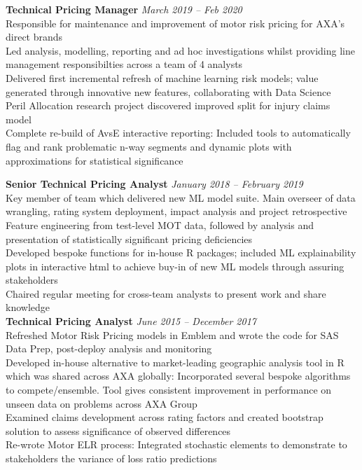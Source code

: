 \documentclass[11pt]{article}
\begin{document}
\begin{description}
\textbf{Technical Pricing Manager} \emph{March 2019 -- Feb 2020}\\
\textbullet \quad Responsible for maintenance and improvement of motor risk pricing for AXA's direct brands\\
\textbullet \quad Led analysis, modelling, reporting and ad hoc investigations whilst providing line management responsibilties across a team of 4 analysts\\
\textbullet \quad Delivered first incremental refresh of machine learning risk models; value generated through innovative new features, collaborating with Data Science\\
\textbullet \quad Peril Allocation research project discovered improved split for injury claims model\\
\textbullet \quad Complete re-build of AvsE interactive reporting: Included tools to automatically flag and rank problematic n-way segments and dynamic plots with approximations for statistical significance

\textbf{Senior Technical Pricing Analyst} \emph{January 2018 -- February 2019}\\
\textbullet \quad Key member of team which delivered new ML model suite. Main overseer of data wrangling, rating system deployment, impact analysis and project retrospective \\
\textbullet \quad Feature engineering from test-level MOT data, followed by analysis and presentation of statistically significant pricing deficiencies \\
\textbullet \quad Developed bespoke functions for in-house R packages; included ML explainability plots in interactive html to achieve buy-in of new ML models through assuring stakeholders\\
\textbullet \quad Chaired regular meeting for cross-team analysts to present work and share knowledge \\

\textbf{Technical Pricing Analyst} \emph{June 2015 -- December 2017}\\
\textbullet \quad Refreshed Motor Risk Pricing models in Emblem and wrote the code for SAS Data Prep, post-deploy analysis and monitoring \\
\textbullet \quad Developed in-house alternative to market-leading geographic analysis tool in R which was shared across AXA globally: Incorporated several bespoke algorithms to compete/ensemble. Tool gives consistent improvement in performance on unseen data on problems across AXA Group\\
\textbullet \quad Examined claims development across rating factors and created bootstrap solution to assess significance of observed differences \\
\textbullet \quad Re-wrote Motor ELR process: Integrated stochastic elements to demonstrate to stakeholders the variance of loss ratio predictions \\


\end{description}
\end{document}
